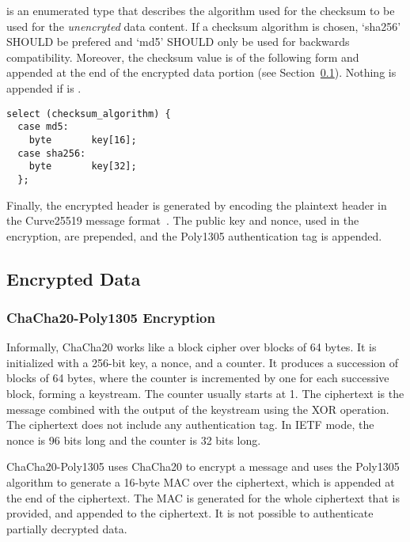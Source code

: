 is an enumerated type that describes the algorithm used for the checksum to be used for the \emph{unencryted} data content.
%
If a checksum algorithm is chosen, `sha256' SHOULD be prefered and `md5' SHOULD only be used for backwards compatibility.
%
Moreover, the checksum value is of the following form and appended at the end of the encrypted data portion (see Section~\ref{encrypted:data}). Nothing is appended if  is .
%
\begin{verbatim}
select (checksum_algorithm) {
  case md5:
    byte       key[16];
  case sha256:
    byte       key[32];
  };
\end{verbatim}


Finally, the encrypted header is generated by encoding the plaintext header in the Curve25519 message format~\cite{RFC7748}.
%
The public key and nonce, used in the encryption, are prepended, and the Poly1305 authentication tag is appended.

\subsection{Encrypted Data}\label{encrypted:data}
\subsubsection{ChaCha20-Poly1305 Encryption}

Informally, ChaCha20 works like a block cipher over blocks of 64 bytes.
%
It is initialized with a 256-bit key, a nonce, and a counter.
%
It produces a succession of blocks of 64 bytes, where the counter is incremented by one for each successive block, forming a keystream.
%
The counter usually starts at 1.
%
The ciphertext is the message combined with the output of the keystream using the XOR operation.
%
The ciphertext does not include any authentication tag.
%
In IETF mode, the nonce is 96 bits long and the counter is 32 bits long.

ChaCha20-Poly1305 uses ChaCha20 to encrypt a message and uses the Poly1305 algorithm to generate a 16-byte MAC over the ciphertext, which is appended at the end of the ciphertext.
%
The MAC is generated for the whole ciphertext that is provided, and appended to the ciphertext.
%
It is not possible to authenticate partially decrypted data.

